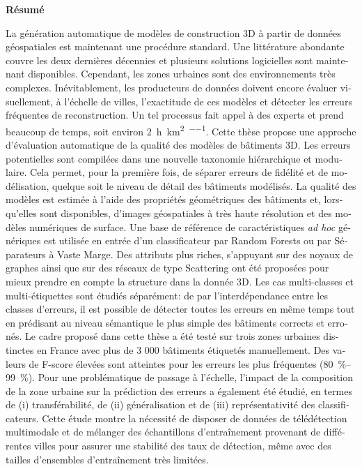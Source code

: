 \begin{french}
    \begin{center}
        \textbf{Résumé}
    \end{center}
    
    La génération automatique de modèles de construction 3D à partir de données géospatiales est maintenant une procédure standard.
    Une littérature abondante couvre les deux dernières décennies et plusieurs solutions logicielles sont maintenant disponibles.
    Cependant, les zones urbaines sont des environnements très complexes.
    Inévitablement, les producteurs de données doivent encore évaluer visuellement, à l'échelle de villes, l'exactitude de ces modèles et détecter les erreurs fréquentes de reconstruction.
    Un tel processus fait appel à des experts et prend beaucoup de temps, soit environ \SI[per-mode=repeated-symbol]{2}{\hour\per\km\squared\per\expert}.
    Cette thèse propose une approche d'évaluation automatique de la qualité des modèles de bâtiments 3D.
    Les erreurs potentielles sont compilées dans une nouvelle taxonomie hiérarchique et modulaire.
    Cela permet, pour la première fois, de séparer erreurs de fidélité et de modélisation, quelque soit le niveau de détail des bâtiments modélisés.
    La qualité des modèles est estimée à l'aide des propriétés géométriques des bâtiments et, lorsqu'elles sont disponibles, d'images géospatiales à très haute résolution et des modèles numériques de surface.
    Une base de référence de caractéristiques \textit{ad hoc} génériques est utilisée en entrée d'un classificateur par Random Forests ou par Séparateurs à Vaste Marge.
    Des attributs plus riches, s'appuyant sur des noyaux de graphes ainsi que sur des réseaux de type Scattering ont été proposées pour mieux prendre en compte la structure dans la donnée 3D.
    Les cas multi-classes et multi-étiquettes sont étudiés séparément: de par l'interdépendance entre les classes d'erreurs, il est possible de détecter toutes les erreurs en même temps tout en prédisant au niveau sémantique le plus simple des bâtiments corrects et erronés.
    Le cadre proposé dans cette thèse a été testé sur trois zones urbaines distinctes en France avec plus de 3 000 bâtiments étiquetés manuellement.
    Des valeurs de F-score élevées sont atteintes pour les erreurs les plus fréquentes (\SIrange[range-phrase={ -- }]{80}{99}{\percent}).
    Pour une problématique de passage à l’échelle, l'impact de la composition de la zone urbaine sur la prédiction des erreurs a également été étudié, en termes de (i) transférabilité, de (ii) généralisation et de (iii) représentativité des classificateurs.
    Cette étude montre la nécessité de disposer de données de télédétection multimodale et de mélanger des échantillons d'entraînement provenant de différentes villes pour assurer une stabilité des taux de détection, même avec des tailles d'ensembles d'entraînement très limitées.    
\end{french}
